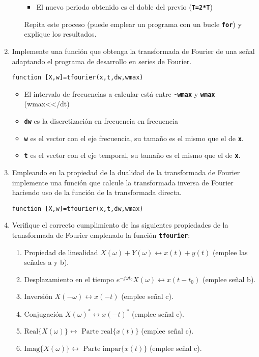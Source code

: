 \documentclass{article}
\newcommand{\code}[1]{\texttt{\textbf{#1}}}
\begin{document}
\begin{enumerate}[leftmargin=*]
\begin{enumerate}[label=\roman*)]
\begin{itemize}[label=$-$]
			\item El nuevo periodo obtenido es el doble del previo (\code{T=2*T})
		\end{itemize}
		Repita este proceso (puede emplear un programa con un bucle \code{for}) y explique los resultados.
	\end{enumerate}
	\item Implemente una función que obtenga la transformada de Fourier de una señal adaptando el programa de desarrollo en series de Fourier.
	\begin{lstlisting}
function [X,w]=tfourier(x,t,dw,wmax)
	\end{lstlisting}
	\begin{itemize}[label=$-$]
		\item El intervalo de frecuencias a calcular está entre \code{-wmax} y \code{wmax} (wmax<<\textpi/dt)
		\item \code{dw} es la discretización en frecuencia en frecuencia
		\item \code{w} es el vector con el eje frecuencia, su tamaño es el mismo que el de \code{x}.
		\item \code{t} es el vector con el eje temporal, su tamaño es el mismo que el de \code{x}.
	\end{itemize}
	\item Empleando en la propiedad de la dualidad de la transformada de Fourier implemente una función que calcule la transformada inversa de Fourier haciendo uso de la función de la transformada directa.
	\begin{lstlisting}
function [X,w]=tfourier(x,t,dw,wmax)
	\end{lstlisting}
	\item Verifique el correcto cumplimiento de las siguientes propiedades de la transformada de Fourier emplenado la función \code{tfourier}:
	\begin{enumerate}[label=\roman*)]
		\item Propiedad de linealidad $X(\omega)+Y(\omega)\longleftrightarrow x(t)+y(t)$ (emplee las señales a y b).
		\item Desplazamiento en el tiempo $e^{-j\omega t_0}X(\omega)\longleftrightarrow x(t-t_0)$ (emplee señal b).
		\item Inversión $X(-\omega)\longleftrightarrow x(-t)$ (emplee señal c).
		\item Conjugación $X(\omega)^*\longleftrightarrow x(-t)^*$ (emplee señal c).
		\item $\mathrm{Real}\{X(\omega)\}\longleftrightarrow\text{ Parte real}\{x(t)\}$ (emplee señal c).
		\item $\mathrm{Imag}\{X(\omega)\}\longleftrightarrow\text{ Parte impar}\{x(t)\}$ (emplee señal c).
	\end{enumerate}
\end{enumerate}
\end{document}
